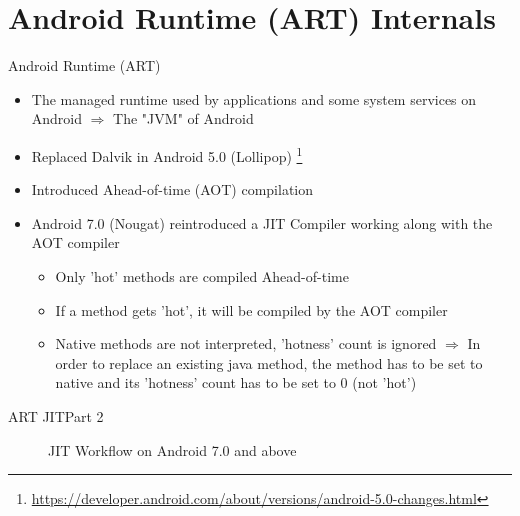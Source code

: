 \section{Android Runtime (ART) Internals}
\begin{frame}{Android Runtime (ART)}
    \begin{itemize}
    \item The managed runtime used by applications and some system services on Android
    $\Rightarrow$ The "JVM" of Android
    \item Replaced Dalvik in Android 5.0 (Lollipop) \footnote{\url{https://developer.android.com/about/versions/android-5.0-changes.html}}
    \item Introduced Ahead-of-time (AOT) compilation
    \item Android 7.0 (Nougat) reintroduced a JIT Compiler working along with the AOT compiler
    \begin{itemize}
    	\item Only 'hot' methods are compiled Ahead-of-time 
    	\item If a method gets 'hot', it will be compiled by the AOT compiler
    	\item Native methods are not interpreted, 'hotness' count is ignored \newline
    	$\Rightarrow$ In order to replace an existing java method, the method has to be set to native and its 'hotness' count has to be set to 0 (not 'hot')
    \end{itemize}
    \end{itemize}
\end{frame}



\begin{frame}[fragile]{ART JIT}{Part 2}

\begin{figure}[H]
	\begin{center}
	\vspace*{-2cm}
	\end{center}
	\caption{JIT Workflow on Android 7.0 and above \cite{JitWorkFlow}}
	\label{JitWorkflow}
\end{figure}


\end{frame}


